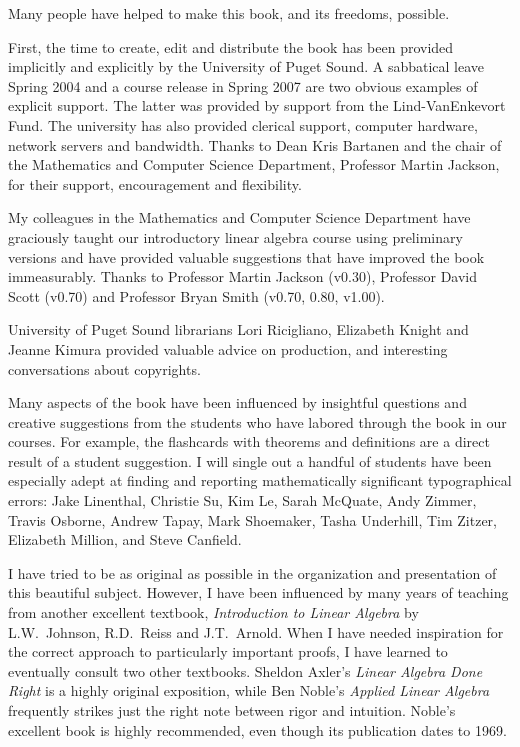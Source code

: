Many people have helped to make this book, and its freedoms, possible.\par
%
First, the time to create, edit and distribute the book has been provided implicitly and explicitly by the University of Puget Sound.  A sabbatical leave Spring 2004 and a course release in Spring 2007 are two obvious examples of explicit support.  The latter was provided by support from the Lind-VanEnkevort Fund.  The university has also provided clerical support, computer hardware, network servers and bandwidth.  Thanks to Dean Kris Bartanen and the chair of the Mathematics and Computer Science Department, Professor Martin Jackson, for their support, encouragement and flexibility.\par
%
My colleagues in the Mathematics and Computer Science Department have graciously taught our introductory linear algebra course using preliminary versions and have provided valuable suggestions that have improved the book immeasurably.  Thanks to Professor Martin Jackson (v0.30), Professor David Scott (v0.70) and Professor Bryan Smith (v0.70, 0.80, v1.00).\par
%
University of Puget Sound librarians Lori Ricigliano, Elizabeth Knight and Jeanne Kimura provided valuable advice on production, and interesting conversations about copyrights.\par
%
Many aspects of the book have been influenced by insightful questions and creative suggestions from the students who have labored through the book in our courses.  For example, the flashcards with theorems and definitions are a direct result of a student suggestion.  I will single out a handful of students have been especially adept at finding and reporting mathematically significant typographical errors: 
Jake Linenthal, Christie Su, Kim Le, Sarah McQuate, 
Andy Zimmer, 
Travis Osborne, Andrew Tapay, Mark Shoemaker, Tasha Underhill, 
Tim Zitzer,
Elizabeth Million,
and Steve Canfield.
%
\par
%
I have tried to be as original as possible in the organization and presentation of this beautiful subject.  However, I have been influenced by many years of teaching from another excellent textbook, {\sl Introduction to Linear Algebra} by L.W.\ Johnson, R.D.\ Reiss and J.T.\ Arnold.  When I have needed inspiration for the correct approach to particularly important proofs, I have learned to eventually consult two other textbooks.  Sheldon Axler's {\sl Linear Algebra Done Right} is a highly original exposition, while Ben Noble's {\sl Applied Linear Algebra} frequently strikes just the right note between rigor and intuition.  Noble's excellent book is highly recommended, even though its publication dates to 1969.\par
